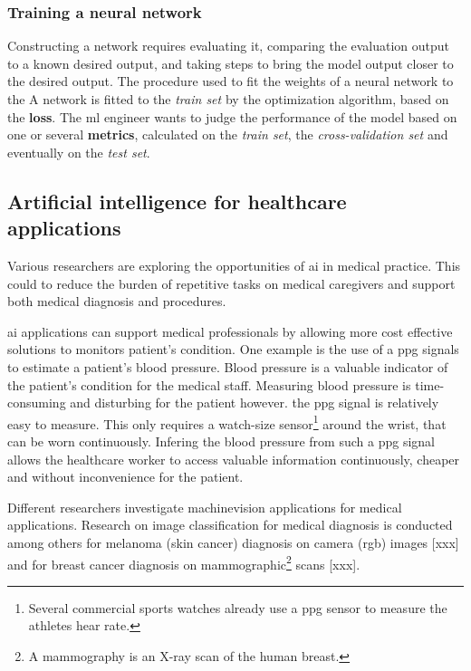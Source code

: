 \subsubsection{Training a neural network}
\par{
    Constructing a network requires evaluating it, comparing the evaluation output to a known desired output, and taking steps to bring the model output closer to the desired output. 
    The procedure used to fit the weights of a neural network to the 
    A network is fitted to the \textit{train set} by the optimization algorithm, based on the \textbf{loss}.
    The \acrshort{ml} engineer wants to judge the performance of the model based on one or several \textbf{metrics}, calculated on the \textit{train set}, the \textit{cross-validation set} and eventually on the \textit{test set}.
}

\subsection{Artificial intelligence for healthcare applications}

\par{
    Various researchers are exploring the opportunities of \Gls{ai} in medical practice.
    This could to reduce the burden of repetitive tasks on medical caregivers and support both medical diagnosis and procedures.
}
\par{
    \Gls{ai} applications can support medical professionals by allowing more cost effective solutions to monitors patient's condition.
    One example is the use of a \acrfull{ppg} signals to estimate a patient's blood pressure.
    Blood pressure is a valuable indicator of the patient's condition for the medical staff.
    Measuring blood pressure is time-consuming and disturbing for the patient however. 
    the \acrshort{ppg} signal is relatively easy to measure. This only requires a watch-size sensor\footnote{Several commercial sports watches already use a \acrshort{ppg} sensor to measure the athletes hear rate.} 
    around the wrist, that can be worn continuously.
    Infering the blood pressure from such a \acrshort{ppg} signal allows the healthcare worker to access valuable information continuously, cheaper and without inconvenience for the patient.
}
\par{
    Different researchers investigate \Gls{machinevision} applications for medical applications. 
    Research on image classification for medical diagnosis is conducted among others for melanoma (skin cancer) diagnosis on camera (\acrshort{rgb}) images [xxx] 
    and for breast cancer diagnosis on mammographic\footnote{A mammography is an X-ray scan of the human breast.} scans [xxx].
}
